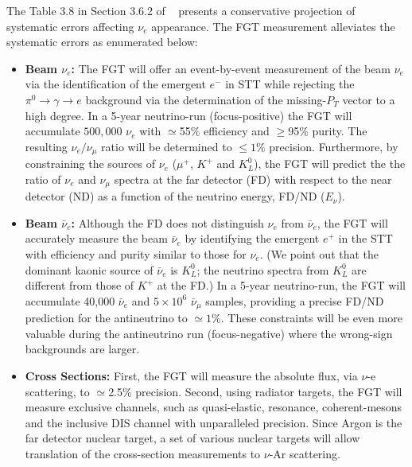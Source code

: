 The Table 3.8   %
in Section 3.6.2 of \volphys\
presents a conservative projection of systematic errors affecting
$\nu_e$ appearance. The FGT measurement alleviates the systematic
errors as enumerated below:
\begin{itemize}
    \item {\bf Beam $\nu_e$:} The FGT will offer an event-by-event
      measurement of the beam $\nu_e$ via the identification of the
      emergent $e^-$ in STT while rejecting the $\pi^0 \rightarrow
      \gamma \rightarrow e$ background via the determination of the
      missing-$P_T$ vector to a high degree.  In a 5-year neutrino-run
      (focus-positive) the FGT will accumulate $500,000$ $\nu_e$
      with $\simeq$55\% efficiency and $\geq$95\% purity.
      The resulting $\nu_e / \nu_\mu$ ratio will be determined to
      $\leq 1\%$ precision. Furthermore, by constraining the sources
      of $\nu_e$ ($\mu^+$, $K^+$ and $K^0_L$), the FGT will predict
      the the ratio of $\nu_e$ and $\nu_\mu$ spectra at the far
      detector (FD) with respect to the near detector (ND) as a
      function of the neutrino energy, FD/ND ($E_\nu$).

    \item {\bf Beam $\bar\nu_e$:} Although the FD does not distinguish
      $\nu_e$ from $\bar\nu_e$, the FGT will accurately measure the
      beam $\bar\nu_e$ by identifying the emergent $e^+$ in the STT
      with efficiency and purity similar to those for $\nu_e$.  (We
      point out that the dominant kaonic source of $\bar\nu_e$ is
      $K^0_L$; the neutrino spectra from $K^0_L$ are different from
      those of $K^+$ at the FD.)  In a 5-year neutrino-run, the FGT
      will accumulate 40,000 $\bar\nu_e$ and $5\times 10^6$
      $\bar\nu_\mu$ samples, providing a precise FD/ND prediction for
      the antineutrino to $\simeq 1\%$.  These constraints will be
      even more valuable during the antineutrino run (focus-negative)
      where the wrong-sign backgrounds are larger.

    \item {\bf Cross Sections:} First, the FGT will 
      measure the absolute flux, via $\nu$-e scattering,
      to $\simeq$2.5\% precision. Second, using radiator targets,
      the FGT will measure exclusive channels, such as
      quasi-elastic, resonance, coherent-mesons and the inclusive DIS
      channel with unparalleled precision. Since Argon is the
      far detector nuclear target, a set of various nuclear targets will
      allow translation of the cross-section measurements to $\nu$-Ar
      scattering.


\end{itemize}
